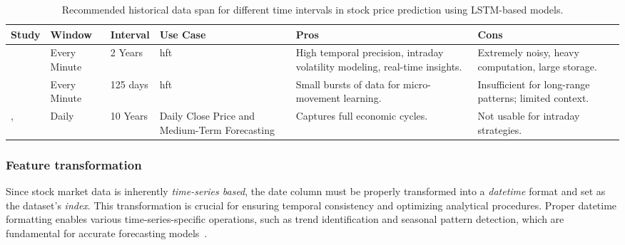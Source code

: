 \begin{landscape}
\begin{table}[H]
\centering
\caption{Recommended historical data span for different time intervals in stock price prediction using LSTM-based models.}
\label{tab:data-window}
\begin{tabular}{p{3cm}llp{3cm}p{6cm}p{6cm}} \hline
     \textbf{Study} & \textbf{Window} & \textbf{Interval} & \textbf{Use Case} & \textbf{Pros}  & \textbf{Cons} \\ \hline\hline
     \parencite{shaban2024SMPDL} & Every Minute & 2 Years & 
     \acrfull{hft} &
     High temporal precision, intraday volatility modeling, real-time insights. &
     Extremely noisy, heavy computation, large storage.
     \\
     \parencite{guo2024LSTMStock} & Every Minute & 125 days & 
     \acrfull{hft} &
      Small bursts of data for micro-movement learning. &
      Insufficient for long-range patterns; limited context.
      \\
      \parencite{chang2024StockPrediction}, 
      \parencite{nabipour2020DeepLearning} & Daily & 10 Years & 
      Daily Close Price and Medium-Term Forecasting &
      Captures full economic cycles. &
      Not usable for intraday strategies.
     \\
     \hline
\end{tabular}
\end{table}
\fillandplacepagenumber
\end{landscape}

\subsubsection{Feature transformation}

Since stock market data is inherently \emph{time-series based}, the date column must be properly transformed 
into a \emph{datetime} format and set as the dataset's \emph{index}. This transformation is crucial for 
ensuring temporal consistency and optimizing analytical procedures. Proper datetime formatting enables 
various time-series-specific operations, such as trend identification and seasonal pattern detection, which 
are fundamental for accurate forecasting models~\parencite{chang2024StockPrediction}.

